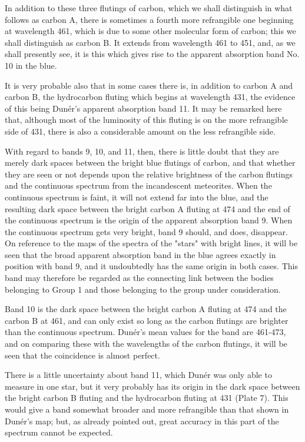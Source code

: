 \documentclass[a4paper, 12pt, oneside, polutonikogreek, english]{article}
\begin{document}
In addition to these three flutings of carbon, which we shall distinguish in what follows as carbon A, there is sometimes a fourth more refrangible one beginning at wavelength 461, which is due to some other molecular form of carbon; this we shall distinguish as carbon B. It extends from wavelength 461 to 451, and, as we shall presently see, it is this which gives rise to the apparent absorption band No. 10 in the blue.

It is very probable also that in some cases there is, in addition to carbon A and carbon B, the hydrocarbon fluting which begins at wavelength 431, the evidence of this being Dunér's apparent absorption band 11. It may be remarked here that, although most of the luminosity of this fluting is on the more refrangible side of 431, there is also a considerable amount on the less refrangible side.

With regard to bands 9, 10, and 11, then, there is little doubt that they are merely dark spaces between the bright blue flutings of carbon, and that whether they are seen or not depends upon the relative brightness of the carbon flutings and the continuous spectrum from the incandescent meteorites. When the continuous spectrum is faint, it will not extend far into the blue, and the resulting dark space between the bright carbon A fluting at 474 and the end of the continuous spectrum is the origin of the apparent absorption band 9. When the continuous spectrum gets very bright, band 9 should, and does, disappear. On reference to the maps of the spectra of the "stars" with bright lines, it will be seen that the broad apparent absorption band in the blue agrees exactly in position with band 9, and it undoubtedly has the same origin in both cases. This band may therefore be regarded as the connecting link between the bodies belonging to Group 1 and those belonging to the group under consideration.

Band 10 is the dark space between the bright carbon A fluting at 474 and the carbon B at 461, and can only exist so long as the carbon flutings are brighter than the continuous spectrum. Dunér's mean values for the band are 461-473, and on comparing these with the wavelengths of the carbon flutings, it will be seen that the coincidence is almost perfect.

There is a little uncertainty about band 11, which Dunér was only able to measure in one star, but it very probably has its origin in the dark space between the bright carbon B fluting and the hydrocarbon fluting at 431 (Plate 7). This would give a band somewhat broader and more refrangible than that shown in Dunér's map; but, as already pointed out, great accuracy in this part of the spectrum cannot be expected.
\end{document}
